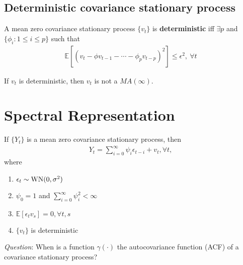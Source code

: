 \documentclass[11pt]{elegantbook}
\begin{document}
\subsection{Deterministic covariance stationary process}
\begin{definition}[Deterministic]
    A mean zero covariance stationary process $\{v_t\}$ is \textbf{deterministic} iff $\exists p$ and $\{\phi_i:1\leq i\leq p\}$ such that
    \begin{equation}
        \begin{aligned}
            \mathbb{E}[(v_t-\phi v_{t-1}-\cdots -\phi_p v_{t-p})^2]\leq \epsilon^2,\ \forall t
        \end{aligned}
        \nonumber
    \end{equation}
\end{definition}
\begin{claim}
    If $v_t$ is deterministic, then $v_t$ is not a $MA(\infty)$.
\end{claim}

\section{Spectral Representation}
\begin{definition}
    If $\{Y_t\}$ is a mean zero covariance stationary process, then
    \begin{equation}
        \begin{aligned}
            Y_t=\sum_{i=0}^\infty \psi_i \epsilon_{t-i} + v_t, \forall t,
        \end{aligned}
        \nonumber
    \end{equation}
    where
    \begin{enumerate}
        \item $\epsilon_t\sim \textnormal{WN}(0,\sigma^2)$
        \item $\psi_0=1$ and $\sum_{i=0}^\infty \psi_i^2<\infty$
        \item $\mathbb{E}[\epsilon_t v_s]=0, \forall t,s$
        \item $\{v_t\}$ is deterministic
    \end{enumerate}
\end{definition}


\textit{Question}:
When is a function $\gamma(\cdot)$ the autocovariance function (ACF) of a covariance stationary process?
\end{document}
